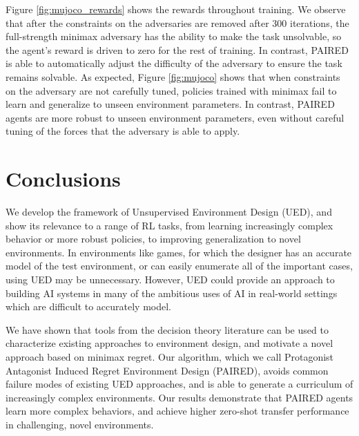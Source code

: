 \documentclass{article}
\begin{document}
Figure \ref{fig:mujoco_rewards} shows the rewards throughout training. We observe that after the constraints on the adversaries are removed after 300 iterations, the full-strength minimax adversary has the ability to make the task unsolvable, so the agent's reward is driven to zero for the rest of training. In contrast, PAIRED is able to automatically adjust the difficulty of the adversary to ensure the task remains solvable. As expected, Figure \ref{fig:mujoco} shows that when constraints on the adversary are not carefully tuned, policies trained with minimax fail to learn and generalize to unseen environment parameters. In contrast, PAIRED agents are more robust to unseen environment parameters, even without careful tuning of the forces that the adversary is able to apply.





\section{Conclusions}

We develop the framework of Unsupervised Environment Design (UED), 
and show its relevance to a range of RL tasks, from learning increasingly complex behavior or more robust policies, to improving generalization to novel environments.  In environments like games, for which the designer has an accurate model of the test environment, or can easily enumerate all of the important cases, using UED may be unnecessary.  However, UED could provide an approach to building AI systems in many of the ambitious uses of AI in real-world settings which are difficult to accurately model.

We have shown that tools from the decision theory literature can be used to characterize existing approaches to environment design, and motivate a novel approach based on minimax regret. Our algorithm, which we call Protagonist Antagonist Induced Regret Environment Design (PAIRED), 
avoids common failure modes of existing UED approaches, and is able to generate a curriculum of increasingly complex environments. Our results demonstrate that PAIRED agents learn more complex behaviors, and achieve higher zero-shot transfer performance in challenging, novel environments.
\end{document}
